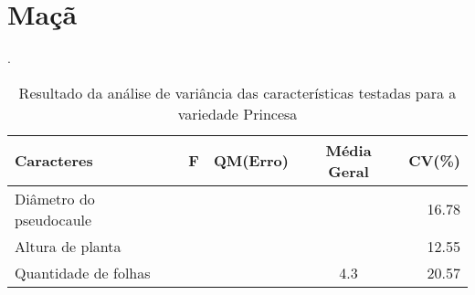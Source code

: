 \section{Maçã}
\begin{table}[!htb]
	\begin{center}
		\caption{Resultado da análise de variância das características testadas para a variedade Princesa}.
		\begin{tabular*}{\textwidth}{@{\extracolsep{\fill}}lcccr}
			\toprule
			\toprule
			\textbf{Caracteres} & \textbf{F}  & \textbf{QM(Erro)} & \textbf{Média Geral} &\textbf {CV(\%)} \\
			\hline
			Diâmetro do pseudocaule &&&& 16.78\\ 
			Altura de planta 		&&&& 12.55\\
			Quantidade de folhas 	&&& 4.3 & 20.57\\
			\hline
			\hline
		\end{tabular*}
	\end{center}
\end{table}
